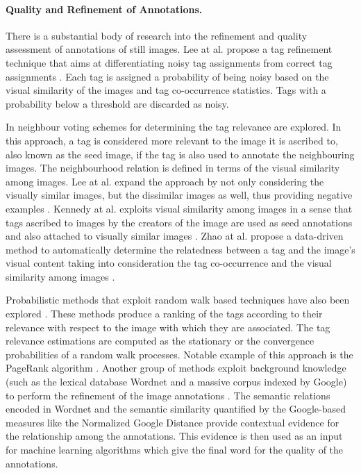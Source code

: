\paragraph{Quality and Refinement of Annotations.} There is a substantial body of research into the refinement and quality assessment of annotations of still images. Lee at al. propose a tag refinement technique that aims at
differentiating noisy tag assignments from correct tag assignments \cite{Lee:2010:TRI:1890924.1891010}. Each tag is assigned a probability of being noisy based on the visual similarity of the images and tag co-occurrence statistics. Tags with a probability below a threshold are discarded as noisy. 

In \cite{Truong:2012:CSK:2324796.2324808,Li:2008:LTR:1460096.1460126} neighbour voting schemes for determining the tag relevance are explored. In this approach, a tag is considered more relevant to the image it is ascribed to, also known as the seed image, if the tag is also used to annotate the neighbouring images. The neighbourhood relation is defined in terms of the visual similarity among images. Lee at al. expand the approach by not only considering the visually similar images, but the dissimilar images as well, thus providing negative examples \cite{Lee:2012:TDE:2390876.2390880}. Kennedy at al. exploits visual similarity among images in a sense that tags ascribed to images by the creators of the image are used as seed annotations and also attached to visually similar images \cite{Kennedy:2009:RTU:1631135.1631139}. Zhao at al. propose a data-driven method to automatically determine the relatedness between a tag and the image's visual content taking into consideration the tag co-occurrence and the visual similarity among images \cite{Zhao:2010:TRV:2174490.2174571}.

Probabilistic methods that exploit random walk based techniques have also been explored \cite{Wang:2006:IAR:1180639.1180774,Liu:2009:TR:1526709.1526757,Li:2012:TRP:2382336.2382380}. These methods produce a ranking of the tags according to their relevance with respect to the image with which they are associated. The tag relevance estimations are computed as the stationary or the convergence probabilities of  a random walk processes. Notable example of this approach is the PageRank algorithm \cite{journals/corr/abs-1012-4872,10.4137/GRSB.S702,junker2008analysis}. Another group of methods exploit background knowledge (such as the lexical database Wordnet and a massive corpus indexed by Google) to perform the refinement of the image annotations \cite{Jin:2010:KBI:1731523.1731529,Wang:2007:RIA:1282280.1282343}. The semantic relations encoded in Wordnet and the semantic similarity quantified by the Google-based measures like the Normalized Google Distance \cite{DBLP:journals/corr/abs-cs-0412098} provide contextual evidence for the relationship among the annotations. This evidence is then used as an input for machine learning algorithms which give the final word for the quality of the annotations. 


